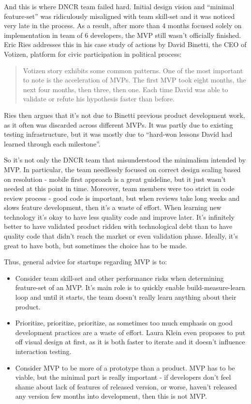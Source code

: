 \documentclass{article}
\begin{document}
And this is where DNCR team failed hard. Initial design vision and ``minimal feature-set'' was ridiculously misaligned with team skill-set and it was noticed very late in the process. As a result, after more than 4 months focused solely on implementation in team of 6 developers, the MVP still wasn't officially finished. Eric Ries \cite{ries2011lean} addresses this in his case study of actions by David Binetti, the CEO of Votizen, platform for civic participation in political process:
\begin{quote}
Votizen story exhibits some common patterns. One of the most important to note is the acceleration of MVPs. The first MVP took eight months, the next four months, then three, then one. Each time David was able to validate or refute his hypothesis faster than before. 
\end{quote}
Ries then argues that it's not due to Binetti previous product development work, as it often was discarded across different MVPs. It was partly due to existing testing infrastructure, but it was mostly due to ``hard-won lessons David had learned through each milestone''.

So it's not only the DNCR team that misunderstood the minimalism intended by MVP. In particular, the team needlessly focused on correct design scaling based on resolution - mobile first approach is a great guideline, but it just wasn't needed at this point in time. Moreover, team members were too strict in code review process - good code is important, but when reviews take long weeks and slows feature development, then it's a waste of effort. When learning new technology it's okay to have less quality code and improve later. It's infinitely better to have validated product ridden with technological debt than to have quality code that didn't reach the market or even validation phase. Ideally, it's great to have both, but sometimes the choice has to be made.

Thus, general advice for startups regarding MVP is to:
\begin{itemize}
\item Consider team skill-set and other performance risks when determining feature-set of an MVP. It's main role is to quickly enable build-measure-learn loop and until it starts, the team doesn't really learn anything about their product.
\item Prioritize, prioritize, prioritize, as sometimes too much emphasis on good development practices are a waste of effort. Laura Klein \cite{klein2013ux} even proposes to put off visual design at first, as it is both faster to iterate and it doesn't influence interaction testing.
\item Consider MVP to be more of a prototype than a product. MVP has to be viable, but the minimal part is really important - if developers don't feel shame about lack of features of released version, or worse, haven't released any version few months into development, then this is not MVP.
\end{itemize}
\end{document}
